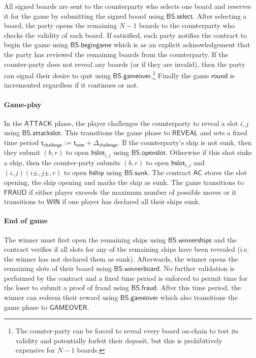 \documentclass{llncs}
\newcommand{\gameattack}{\mathsf{ATTACK}}
\newcommand{\gamereveal}{\mathsf{REVEAL}}
\newcommand{\gamewinner}{\mathsf{WIN}}
\newcommand{\gamefraud}{\mathsf{FRAUD}}
\newcommand{\gamefinished}{\mathsf{GAMEOVER}}
\newcommand{\hslot}{\mathsf{hslot}}
\newcommand{\hship}{\mathsf{hship}}
\newcommand{\battleshipfraud}{\mathsf{BS.fraud}}
\newcommand{\battleshipattackslot}{\mathsf{BS.attackslot}}
\newcommand{\battleshipbegin}{\mathsf{BS.begingame}}
\newcommand{\battleshipselectboard}{\mathsf{BS.select}}
\newcommand{\battleshiprevealslot}{\mathsf{BS.openslot}}
\newcommand{\battleshipsinking}{\mathsf{BS.sunk}}
\newcommand{\battleshiprevealships}{\mathsf{BS.winnerships}}
\newcommand{\battleshiprevealboard}{\mathsf{BS.winnerboard}}
\newcommand{\battleshipgameover}{\mathsf{BS.gameover}}
\newcommand{\appcontract}{\mathsf{AC}}
\newcommand{\timerchallenge}{\mathsf{\Delta}_{\mathsf{challenge}}}
\newcommand{\timechallenge}{\mathsf{t}_{\mathsf{challenge}}}
\newcommand{\timenow}{\mathsf{t}_{\mathsf{now}}}
\begin{document}
All signed boards are sent to the counterparty who selects one board and reserves it for the game by submitting the signed board using $\battleshipselectboard$. 
After selecting a board, the party opens the remaining $N-1$ boards to the counterparty who checks the validity of each board. 
If satisified, each party notifies the contract to begin the game using $\battleshipbegin$ which is as an explicit acknowledgement that the party has reviewed the remaining boards from the counterparty.
If the counter-party does not reveal any boards (or if they are invalid), then the party can signal their desire to quit  using $\battleshipgameover$.\footnote{The counter-party can be forced to reveal every board on-chain to test its validity and potentially forfeit their deposit, but this is prohibitively expensive for $N-1$ boards.}
Finally the game $\mathsf{round}$ is incremented regardless if it continues or not. 

\paragraph{Game-play} \label{sec:gameplay}

In the $\gameattack$ phase, the player challenges the counterparty to reveal a slot $i,j$ using $\battleshipattackslot$.
This transitions the game phase to $\gamereveal$ and sets a fixed time period $\timechallenge := \timenow + \timerchallenge$.
If the counterparty's ship is not sunk, then they submit $(b,r)$ to open $\hslot_{i,j}$ using $\battleshiprevealslot$. 
Otherwise if this shot sinks a ship, then the counter-party submits $(b,r)$ to open $\hslot_{i,j}$ and $(i,j)(i\pm,j\pm,r)$ to open $\hship$ using $\battleshipsinking$. 
The contract $\appcontract$ stores the slot opening, the ship opening and marks the ship as sunk. 
The game transitions to $\gamefraud$ if either player exceeds the maximum number of possible moves or it transitions to $\gamewinner$ if one player has declared all their ships sunk. 

\paragraph{End of game} 

The winner must first open the remaining ships using $\battleshiprevealships$ and the contract verifies if all slots for any of the remaining ships have been revealed (i.e. the winner has not declared them as sunk). 
Afterwards, the winner opens the remaining slots of their board using $\battleshiprevealboard$. 
No further validation is performed by the contract and a fixed time period is enforced to permit time for the loser to submit a proof of fraud using $\battleshipfraud$.
After this time period, the winner can redeem their reward using $\battleshipgameover$ which also transitions the game phase to $\gamefinished$. 
\end{document}
